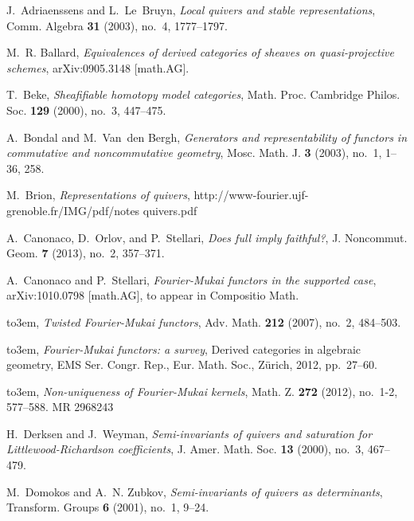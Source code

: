 \documentclass{amsart}
\numberwithin{equation}{section}
\theoremstyle{definition}
\theoremstyle{remark}
\begin{document}
\providecommand{\bysame}{\leavevmode\hbox to3em{\hrulefill}\thinspace}
\providecommand{\MR}{\relax\ifhmode\unskip\space\fi MR }
\providecommand{\MRhref}[2]{  \href{http://www.ams.org/mathscinet-getitem?mr=#1}{#2}
}
\providecommand{\href}[2]{#2}
\begin{thebibliography}{10}

J.~Adriaenssens and L.~Le~Bruyn, \emph{Local quivers and stable
  representations}, Comm. Algebra \textbf{31} (2003), no.~4, 1777--1797.

M.~R. Ballard, \emph{Equivalences of derived categories of sheaves on
  quasi-projective schemes}, arXiv:0905.3148 [math.AG].

T.~Beke, \emph{Sheafifiable homotopy model categories}, Math. Proc. Cambridge
  Philos. Soc. \textbf{129} (2000), no.~3, 447--475.

A.~Bondal and M.~Van~den Bergh, \emph{Generators and representability of
  functors in commutative and noncommutative geometry}, Mosc. Math. J.
  \textbf{3} (2003), no.~1, 1--36, 258.

M.~Brion, \emph{Representations of quivers}, http://www-fourier.ujf-grenoble.fr/IMG/pdf/notes quivers.pdf

A.~Canonaco, D.~Orlov, and P.~Stellari, \emph{Does full imply faithful?}, J.
  Noncommut. Geom. \textbf{7} (2013), no.~2, 357--371.

A.~Canonaco and P.~Stellari, \emph{Fourier-Mukai functors in the supported
  case}, arXiv:1010.0798 [math.AG], to appear in Compositio Math.

\bysame, \emph{Twisted {F}ourier-{M}ukai functors}, Adv. Math. \textbf{212}
  (2007), no.~2, 484--503.

\bysame, \emph{Fourier-{M}ukai functors: a survey}, Derived categories in
  algebraic geometry, EMS Ser. Congr. Rep., Eur. Math. Soc., Z\"urich, 2012,
  pp.~27--60.

\bysame, \emph{Non-uniqueness of {F}ourier-{M}ukai kernels}, Math. Z.
  \textbf{272} (2012), no.~1-2, 577--588. \MR{2968243}

H.~Derksen and J.~Weyman, \emph{Semi-invariants of quivers and saturation
  for {L}ittlewood-{R}ichardson coefficients}, J. Amer. Math. Soc. \textbf{13}
  (2000), no.~3, 467--479.

M.~Domokos and A.~N. Zubkov, \emph{Semi-invariants of quivers as determinants},
  Transform. Groups \textbf{6} (2001), no.~1, 9--24.


\end{thebibliography}
\end{document}
